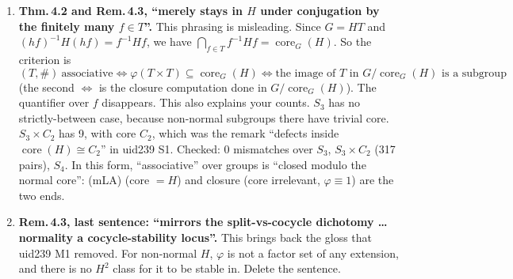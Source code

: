 \documentclass[11pt]{article}
\renewcommand{\Im}{\operatorname{Im}}
\newcommand{\core}{\operatorname{core}}
\begin{document}
\begin{enumerate}[label=\textbf{S\arabic*.},leftmargin=*]
  This reads the diamond off directly. Full (mLA) asks for (ii) at \emph{every} $x$. Closure makes (ii)
  vacuous, because then $x=gh\in\Im K$, where (mLA) is trivial (your own Remark 1.4). Over a group
  $\theta_K$ is the coset relation of $\core_G(H)$, and (iii) is exactly your Theorem 4.2 (see S3). So the
  ``single condition'' is (mLA) on products of normalized arrows. (mLA) and closure are its two
  sufficient specializations. Checked: (i)$\Leftrightarrow$(iii) on all 1578 normalizers of all 156 monoids of
  order 4 (unit fixed) and all orders ${\le}3$, with 0 mismatches (Part D). Use it, credit it, or prove it
  better. Either way, the ``settles'' paragraph should not claim more than the note proves.
\item \textbf{Thm.\,4.2 and Rem.\,4.3, ``merely stays in $H$ under conjugation by the finitely many
  $f\in T$''.} This phrasing is misleading. Since $G=HT$ and $(hf)^{-1}H(hf)=f^{-1}Hf$, we have
  $\bigcap_{f\in T}f^{-1}Hf=\core_G(H)$. So the criterion is
  \[(T,\#)\ \text{associative}\iff\varphi(T\times T)\subseteq\core_G(H)
  \iff\text{the image of $T$ in $G/\core_G(H)$ is a subgroup}\]
  (the second $\Leftrightarrow$ is the closure computation done in $G/\core_G(H)$). The quantifier over $f$
  disappears. This also explains your counts. $S_3$ has no strictly-between case, because non-normal subgroups
  there have trivial core. $S_3\times C_2$ has 9, with core $C_2$, which was the remark ``defects inside
  $\core(H)\cong C_2$'' in uid239 S1. Checked: 0 mismatches over $S_3$, $S_3\times C_2$ (317 pairs), $S_4$.
  In this form, ``associative'' over groups is ``closed modulo the normal core'': (mLA) (core $=H$) and closure
  (core irrelevant, $\varphi\equiv1$) are the two ends.
\item \textbf{Rem.\,4.3, last sentence: ``mirrors the split-vs-cocycle dichotomy \dots normality a
  cocycle-stability locus''.} This brings back the gloss that uid239 M1 removed. For non-normal $H$,
  $\varphi$ is not a factor set of any extension, and there is no $H^2$ class for it to be stable in. Delete
  the sentence.
\end{enumerate}
\end{document}
